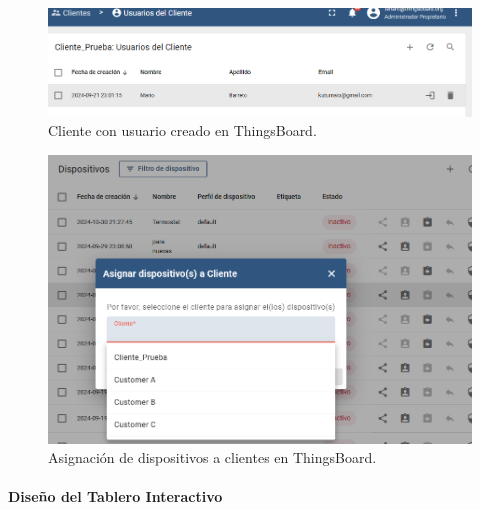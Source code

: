 \begin{figure}[H]
\leavevmode
\begin{minipage}{\textwidth}
\begin{center}
\includegraphics[width=\textwidth]{./capitulo_04/imagen/tb/us_cleint.png}
\caption{Cliente con usuario creado en ThingsBoard. \label{fig:tbclient}}
\end{center}
\end{minipage}
\end{figure}

\begin{figure}[H]
\leavevmode
\begin{minipage}{\textwidth}
\begin{center}
\includegraphics[scale=0.58]{./capitulo_04/imagen/tb/dispos_client.png}
\caption{Asignación de dispositivos a clientes en ThingsBoard. \label{fig:tbclient_disp}}
\end{center}
\end{minipage}
\end{figure}

\paragraph{Diseño del Tablero Interactivo\\}

